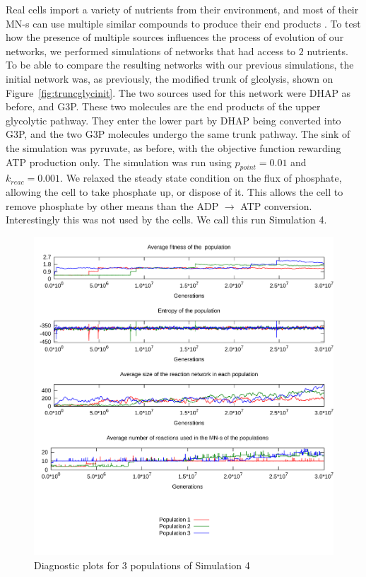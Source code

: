 \documentclass[a4paper,12pt]{article}
\begin{document}
Real cells import a variety of nutrients from their environment, and most of their \mbox{MN-s} can use multiple similar compounds to produce their end products \cite{latent}. To test how the presence of multiple sources influences the process of evolution of our networks, we performed simulations of networks that had access to $2$ nutrients. To be able to compare the resulting networks with our previous simulations, the initial network was, as previously, the modified trunk of glcolysis, shown on Figure~\ref{fig:truncglycinit}. The two sources used for this network were DHAP as before, and G3P. These two molecules are the end products of the upper glycolytic pathway. They enter the lower part by DHAP being converted into G3P, and the two G3P molecules undergo the same trunk pathway. The sink of the simulation was pyruvate, as before, with the objective function rewarding ATP production only. The simulation was run using $p_{point}=0.01$ and $k_{reac}=0.001$. We relaxed the steady state condition on the flux of phosphate, allowing the cell to take phosphate up, or dispose of it. This allows the cell to remove phosphate by other means than the ADP $\rightarrow$ ATP conversion. Interestingly this was not used by the cells. We call this run Simulation 4.

\begin{figure}[htpb]
	\centering
	\includegraphics[width=1\linewidth]{simulationmultisource.pdf}
	\caption{Diagnostic plots for 3 populations of Simulation 4}
	\label{fig:simulationmultisource}
\end{figure}
\end{document}
